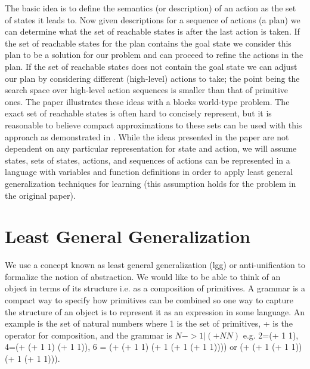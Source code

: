 \documentclass[a4paper,12pt]{article}
\begin{document}
The basic idea is to define the semantics (or description) of an action as the set of states it leads to.  Now given descriptions for a sequence of actions (a plan) we can determine what the set of reachable states is after the last action is taken. If the set of reachable states for the plan contains the goal state we consider this plan to be a solution for our problem and can proceed to refine the actions in the plan.  If the set of reachable states does not contain the goal state we can adjust our plan by considering different (high-level) actions to take; the point being the search space over high-level action sequences is smaller than that of primitive ones.  The paper illustrates these ideas with a blocks world-type problem.  The exact set of reachable states is often hard to concisely represent, but it is reasonable to believe compact approximations to these sets can be used with this approach as demonstrated in \cite{Marthi:EECS-2007-89}.  While the ideas presented in the paper are not dependent on any particular representation for state and action, we will assume states, sets of states, actions, and sequences of actions can be represented in a language with variables and function definitions in order to apply least general generalization techniques for learning (this assumption holds for the problem in the original paper).

\section{Least General Generalization}
We use a concept known as least general generalization (lgg) or anti-unification to formalize the notion of abstraction.  We would like to be able to think of an object in terms of its structure i.e. as a composition of primitives.  A grammar is a compact way to specify how primitives can be combined so one way to capture the structure of an object is to represent it as an expression in some language.  An example is the set of natural numbers where {1} is the set of primitives, + is the operator for composition, and the grammar is $N -> 1 | (+ N N)$ e.g. 2=(+ 1 1), 4=(+ (+ 1 1) (+ 1 1)), 6 = (+ (+ 1 1) (+ 1 (+ 1 (+ 1 1)))) or (+ (+ 1 (+ 1 1)) (+ 1 (+ 1 1))).
\end{document}
